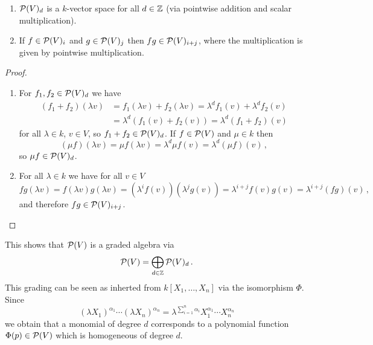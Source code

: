 \begin{lem}
  \begin{enumerate}[label=\emph{\alph*)},leftmargin=*]
    \item
      $\mathcal{P}(V)_d$ is a $k$-vector space for all $d \in \mathbb{Z}$ (via pointwise addition and scalar multiplication).
    \item
      If $f \in \mathcal{P}(V)_i$ and $g \in \mathcal{P}(V)_j$ then $fg \in \mathcal{P}(V)_{i+j}$, where the multiplication is given by pointwise multiplication.
  \end{enumerate}
\end{lem}
\begin{proof}
  \begin{enumerate}[label=\emph{\alph*)},leftmargin=*]
    \item For $f_1, f_2 \in \mathcal{P}(V)_d$ we have
      \begin{align*}
            (f_1+f_2)(\lambda v)
        &=  f_1(\lambda v) + f_2(\lambda v)
         =  \lambda^d f_1(v) + \lambda^d f_2(v) \\
        &=  \lambda^d (f_1(v) + f_2(v))
         =  \lambda^d (f_1 + f_2)(v)
      \end{align*}
      for all $\lambda \in k$, $v \in V$, so $f_1 + f_2 \in \mathcal{P}(V)_d$. If $f \in \mathcal{P}(V)$ and $\mu \in k$ then
      \[
          (\mu f)(\lambda v)
        = \mu f(\lambda v)
        = \lambda^d \mu f(v)
        = \lambda^d (\mu f)(v) \,,
      \]
      so $\mu f \in \mathcal{P}(V)_d$.
    \item
      For all $\lambda \in k$ we have for all $v \in V$
      \[
          fg(\lambda v)
        = f(\lambda v) g(\lambda v)
        = \left( \lambda^i f(v) \right)\left( \lambda^j g(v) \right)
        = \lambda^{i+j} f(v) g(v)
        = \lambda^{i+j} (fg)(v) \,,
      \]
      and therefore $fg \in \mathcal{P}(V)_{i+j}$.
    \qedhere
  \end{enumerate}
\end{proof}

This shows that $\mathcal{P}(V)$ is a graded algebra via
\[
      \mathcal{P}(V)
    = \bigoplus_{d \in \mathbb{Z}} \mathcal{P}(V)_d \,.
\]
This grading can be seen as inherted from $k[X_1, \dotsc, X_n]$ via the isomorphism $\Phi$. Since
\[
    (\lambda X_1)^{\alpha_1} \dotsm (\lambda X_n)^{\alpha_n}
  = \lambda^{\sum_{i=1}^n \alpha_i} X_1^{\alpha_1} \dotsm X_n^{\alpha_n}
\]
we obtain that a monomial of degree $d$ corresponds to a polynomial function $\Phi(p) \in \mathcal{P}(V)$ which is homogeneous of degree $d$.


